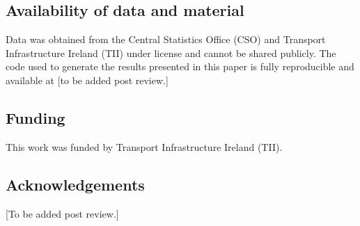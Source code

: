 \documentclass[
  super,
  preprint,
  3p]{elsarticle}
\providecommand{\DIFaddbegin}{} %
\providecommand{\DIFaddend}{} %
\providecommand{\DIFdelbegin}{} %
\providecommand{\DIFdelend}{} %
\newcommand{\DIFscaledelfig}{0.5}
\newlength{\DIFdelgraphicswidth} %
\newlength{\DIFdelgraphicsheight} %
\newcommand{\DIFaddincludegraphics}[2][]{{\color{blue}\fbox{\DIFOincludegraphics[#1]{#2}}}} %
\newcommand{\DIFdelincludegraphics}[2][]{%
\sbox{\DIFdelgraphicsbox}{\DIFOincludegraphics[#1]{#2}}%
\settoboxwidth{\DIFdelgraphicswidth}{\DIFdelgraphicsbox} %
\settoboxtotalheight{\DIFdelgraphicsheight}{\DIFdelgraphicsbox} %
\scalebox{\DIFscaledelfig}{%
\parbox[b]{\DIFdelgraphicswidth}{\usebox{\DIFdelgraphicsbox}\\[-\baselineskip] \rule{\DIFdelgraphicswidth}{0em}}\llap{\resizebox{\DIFdelgraphicswidth}{\DIFdelgraphicsheight}{%
\setlength{\unitlength}{\DIFdelgraphicswidth}%
\begin{picture}(1,1)%
\thicklines\linethickness{2pt} %
{\color[rgb]{1,0,0}\put(0,0){\framebox(1,1){}}}%
{\color[rgb]{1,0,0}\put(0,0){\line( 1,1){1}}}%
{\color[rgb]{1,0,0}\put(0,1){\line(1,-1){1}}}%
\end{picture}%
}\hspace*{3pt}}} %
} %
\DeclareRobustCommand{\DIFaddbegin}{\DIFOaddbegin \let\includegraphics\DIFaddincludegraphics} %
\DeclareRobustCommand{\DIFaddend}{\DIFOaddend \let\includegraphics\DIFOincludegraphics} %
\DeclareRobustCommand{\DIFdelbegin}{\DIFOdelbegin \let\includegraphics\DIFdelincludegraphics} %
\DeclareRobustCommand{\DIFdelend}{\DIFOaddend \let\includegraphics\DIFOincludegraphics} %
\begin{document}
\subsection*{Availability of data and
material}\label{availability-of-data-and-material}

Data was obtained from the Central Statistics Office (CSO) and Transport
Infrastructure Ireland (TII) under license and cannot be shared
publicly. The code used to generate the results presented in this paper
is fully reproducible and available at {[}to be added post review.{]}

\subsection*{Funding}\label{funding}

This work was funded by Transport Infrastructure Ireland (TII).

\subsection*{Acknowledgements}\label{acknowledgements}

{[}To be added post review.{]}


  \DIFdelbegin %
\DIFdelend \DIFaddbegin 
\DIFaddend 
\end{document}
